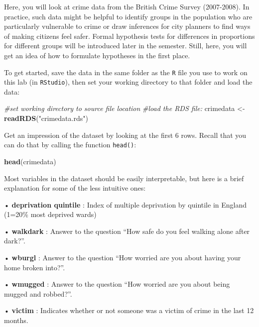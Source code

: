 \documentclass[
]{book}
\newenvironment{Shaded}{\begin{snugshade}}{\end{snugshade}}
\newcommand{\CommentTok}[1]{\textcolor[rgb]{0.56,0.35,0.01}{\textit{#1}}}
\newcommand{\FunctionTok}[1]{\textcolor[rgb]{0.13,0.29,0.53}{\textbf{#1}}}
\newcommand{\NormalTok}[1]{#1}
\newcommand{\OtherTok}[1]{\textcolor[rgb]{0.56,0.35,0.01}{#1}}
\newcommand{\StringTok}[1]{\textcolor[rgb]{0.31,0.60,0.02}{#1}}
\begin{document}
Here, you will look at crime data from the British Crime Survey (2007-2008). In practice, such data might be helpful to identify groups in the population who are particularly vulnerable to crime or draw inferences for city planners to find ways of making citizens feel safer. Formal hypothesis tests for differences in proportions for different groups will be introduced later in the semester. Still, here, you will get an idea of how to formulate hypotheses in the first place.

To get started, save the data in the same folder as the \texttt{R} file you use to work on this lab (in \texttt{RStudio}), then set your working directory to that folder and load the data:

\begin{Shaded}
\begin{Highlighting}[]
\CommentTok{\#set working directory to source file location }
\CommentTok{\#load the RDS file:}
\NormalTok{crimedata }\OtherTok{\textless{}{-}} \FunctionTok{readRDS}\NormalTok{(}\StringTok{"crimedata.rds"}\NormalTok{)}
\end{Highlighting}
\end{Shaded}

Get an impression of the dataset by looking at the first 6 rows. Recall that you can do that by calling the function \texttt{head()}:

\begin{Shaded}
\begin{Highlighting}[]
\FunctionTok{head}\NormalTok{(crimedata)}
\end{Highlighting}
\end{Shaded}

Most variables in the dataset should be easily interpretable, but here is a brief explanation for some of the less intuitive ones:

• \textbf{deprivation quintile} : Index of multiple deprivation by quintile in England (1=20\% most deprived wards)

• \textbf{walkdark} : Answer to the question ``How safe do you feel walking alone after dark?''.

• \textbf{wburgl} : Answer to the question ``How worried are you about having your home broken into?''.

• \textbf{wmugged} : Answer to the question ``How worried are you about being mugged and robbed?''.

• \textbf{victim} : Indicates whether or not someone was a victim of crime in the last 12 months.
\end{document}
